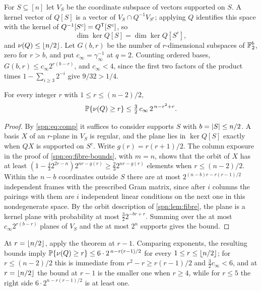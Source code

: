 
For $S\subseteq[n]$ let $V_S$ be the coordinate subspace of vectors supported on $S$. A kernel
vector of $Q[S]$ is a vector of $V_S\cap Q^{-1}V_{S^c}$; applying $Q$ identifies this space
with the kernel of $Q^{-1}[S^c]=Q^{\mathsf{T}}[S^c]$, so
\begin{equation}\label{spn:eq:comp}
 \dim\ker Q[S]=\dim\ker Q[S^c],
\end{equation}
and $\nu(Q)\le\lfloor n/2\rfloor$. Let $G(b,r)$ be the number of $r$-dimensional subspaces of
$\mathbb{F}_2^b$, zero for $r>b$, and put $c_\infty=\gamma_\infty^{-1}$ at $q=2$. Counting ordered
bases, $G(b,r)\le c_\infty2^{r(b-r)}$, and $c_\infty<4$, since the first two factors of the
product times $1-\sum_{i\ge3}2^{-i}$ give $9/32>1/4$.

\begin{theorem}\label{spn:thm:binary}
For every integer $r$ with $1\le r\le(n-2)/2$,
\[
 \mathbb{P}\{\nu(Q)\ge r\}\le\tfrac32\,c_\infty\,2^{\,n-r^2+r}.
\]
\end{theorem}

\begin{proof}
By \eqref{spn:eq:comp} it suffices to consider supports $S$ with $b=\lvert S\rvert\le n/2$. A basis
$X$ of an $r$-plane in $V_S$ is regular, and the plane lies in $\ker Q[S]$ exactly when $QX$ is
supported on $S^c$. Write $g(r)=r(r+1)/2$. The column exposure in the proof of
\eqref{spn:eq:fibre-bounds}, with $m=n$, shows that the orbit of $X$ has at least
$(1-\tfrac43 2^{2r-n})2^{nr-g(r)}\ge\tfrac23 2^{nr-g(r)}$ elements when $r\le(n-2)/2$. Within
the $n-b$ coordinates outside $S$ there are at most $2^{(n-b)r-r(r-1)/2}$ independent frames
with the prescribed Gram matrix, since after $i$ columns the pairings with them are $i$
independent linear conditions on the next one in this nondegenerate space. By the orbit
description of \cref{spn:lem:fibre}, the plane is a kernel plane with probability at most
$\tfrac32 2^{-br+r}$. Summing over the at most $c_\infty2^{r(b-r)}$ planes of $V_S$ and the at
most $2^n$ supports gives the bound.
\end{proof}

At $r=\lfloor n/2\rfloor$, apply the theorem at $r-1$. Comparing exponents, the resulting bounds imply
$\mathbb{P}\{\nu(Q)\ge r\}\le6\cdot2^{\,n-r(r-1)/2}$ for every $1\le r\le\lfloor n/2\rfloor$; for
$r\le(n-2)/2$ this is immediate from $r^2-r\ge r(r-1)/2$ and $\tfrac32c_\infty<6$, and at
$r=\lfloor n/2\rfloor$ the bound at $r-1$ is the smaller one when $r\ge4$, while for $r\le5$ the right
side $6\cdot2^{n-r(r-1)/2}$ is at least one.

